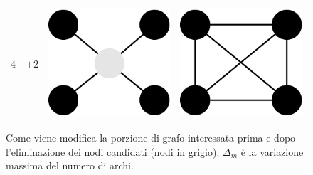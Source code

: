 \begin{figure}
\begin{tabular}{cccc}
$4$ & $+2$ & \includegraphics[height=0.04\textheight]{Grafica/el-G} & \includegraphics[height=0.04\textheight]{Grafica/el-H}\\
\midrule
\end{tabular}
\caption{Come viene modifica la porzione di grafo interessata prima e dopo l'eliminazione dei nodi candidati (nodi in grigio). $\Delta_m$ è la variazione massima del numero di archi.}
\label{tbl:elimino}
\end{figure}

